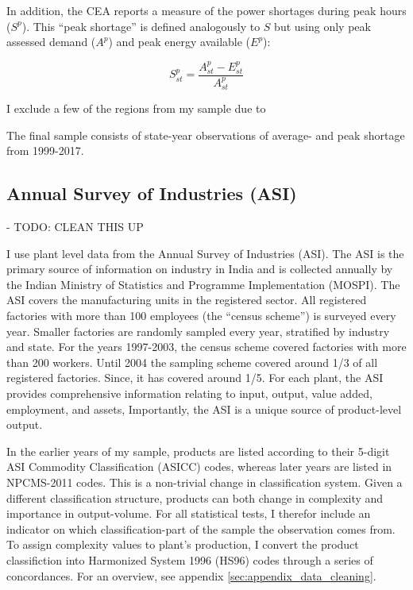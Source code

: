 \documentclass[11pt]{article}
\begin{document}
In addition, the CEA reports a measure of the power shortages during peak hours (\(S^p\)). This ``peak shortage'' is defined analogously to \(S\) but using only peak assessed demand (\(A^{p}\)) and peak energy available (\(E^p\)):

\[
S^{p}_{st} = \frac{A^{p}_{st} - E^{p}_{st}}{A^{p}_{st}}
\]

I exclude a few of the regions from my sample due to 

The final sample consists of state-year observations of average- and peak shortage from 1999-2017.

\subsection{Annual Survey of Industries (ASI)}%
\label{sub:annual_survey_of_industries_asi}

- TODO: CLEAN THIS UP 

I use plant level data from the Annual Survey of Industries (ASI). The ASI is the primary source of information on industry in India and is collected annually by the Indian Ministry of Statistics and Programme Implementation (MOSPI). The ASI covers the manufacturing units in the registered sector. All registered factories with more than 100 employees (the ``census scheme'') is surveyed every year. Smaller factories are randomly sampled every year, stratified by industry and state. For the years 1997-2003, the census scheme covered factories with more than 200 workers. Until 2004 the sampling scheme covered around 1/3 of all registered factories. Since, it has covered around 1/5. For each plant, the ASI provides comprehensive information relating to input, output, value added, employment, and assets, Importantly, the ASI is a unique source of product-level output. 

In the earlier years of my sample, products are listed according to their 5-digit ASI Commodity Classification (ASICC) codes, whereas later years are listed in NPCMS-2011 codes. This is a non-trivial change in classification system. Given a different classification structure, products can both change in complexity and importance in output-volume. For all statistical tests, I therefor include an indicator on which classification-part of the sample the observation comes from. To assign complexity values to plant's production, I convert the product classifiction into Harmonized System 1996 (HS96) codes through a series of concordances. For an overview, see appendix \ref{sec:appendix_data_cleaning}.
\end{document}
